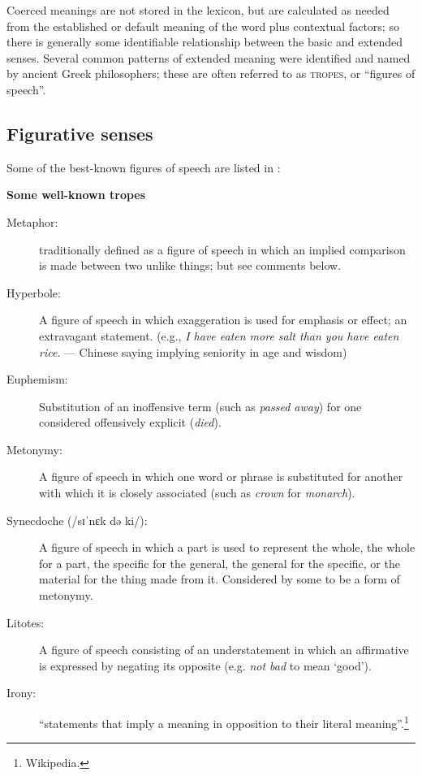 Coerced meanings are not stored in the lexicon, but are calculated as needed from the established or default meaning of the word plus contextual factors; so there is generally some identifiable relationship between the basic and extended senses. Several common patterns of extended meaning were identified and named by ancient Greek philosophers; these are often referred to as \textsc{tropes}, or “figures of speech”.


\subsection{Figurative senses}\label{sec:} %

Some of the best-known figures of speech are listed in :

\ea \label{ex:5.18}
\textbf{Some well-known tropes}\\
\begin{description}
\item[Metaphor:] traditionally defined as a figure of speech in which an implied comparison is made between two unlike things; but see comments below.
\item[Hyperbole:] A figure of speech in which exaggeration is used for emphasis or effect; an extravagant statement. (e.g., \textit{I have eaten more salt than you have eaten rice}. — Chinese saying implying seniority in age and wisdom)
\item[Euphemism:] Substitution of an inoffensive term (such as \textit{passed away}) for one considered offensively explicit (\textit{died}).
\item[Metonymy:] A figure of speech in which one word or phrase is substituted for another with which it is closely associated (such as \textit{crown} for \textit{monarch}).
\item[Synecdoche (/sɪˈnɛk də ki/):] A figure of speech in which a part is used to represent the whole, the whole for a part, the specific for the general, the general for the specific, or the material for the thing made from it. Considered by some to be a form of metonymy.
\item[Litotes:] A figure of speech consisting of an understatement in which an affirmative is expressed by negating its opposite (e.g. \textit{not bad} to mean ‘good’).
\item[Irony:] “statements that imply a meaning in opposition to their literal meaning”.\footnote{Wikipedia.}
\end{description}
\z


